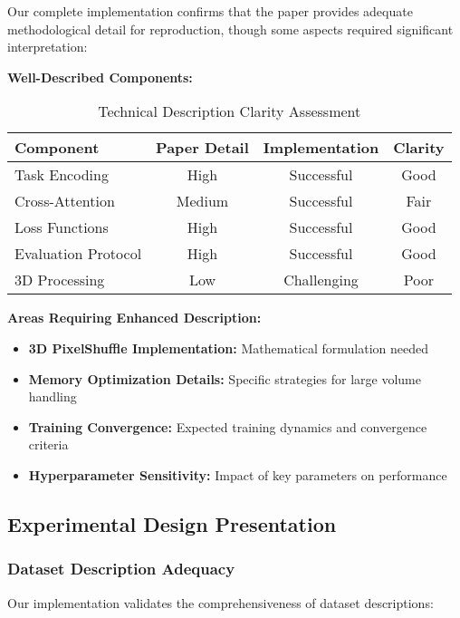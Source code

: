 Our complete implementation confirms that the paper provides adequate methodological detail for reproduction, though some aspects required significant interpretation:

\textbf{Well-Described Components:}
\begin{table}[h]
\centering
\small
\begin{tabular}{|l|c|c|c|}
\hline
\textbf{Component} & \textbf{Paper Detail} & \textbf{Implementation} & \textbf{Clarity} \\
\hline
Task Encoding & High & Successful & \textcolor{validatedgreen}{Good} \\
Cross-Attention & Medium & Successful & \textcolor{warningorange}{Fair} \\
Loss Functions & High & Successful & \textcolor{validatedgreen}{Good} \\
Evaluation Protocol & High & Successful & \textcolor{validatedgreen}{Good} \\
3D Processing & Low & Challenging & \textcolor{errorred}{Poor} \\
\hline
\end{tabular}
\caption{Technical Description Clarity Assessment}
\label{tab:clarity_assessment}
\end{table}

\textbf{Areas Requiring Enhanced Description:}
\begin{itemize}
    \item \textbf{3D PixelShuffle Implementation:} Mathematical formulation needed
    \item \textbf{Memory Optimization Details:} Specific strategies for large volume handling
    \item \textbf{Training Convergence:} Expected training dynamics and convergence criteria
    \item \textbf{Hyperparameter Sensitivity:} Impact of key parameters on performance
\end{itemize}

\subsection*{Experimental Design Presentation}

\subsubsection*{Dataset Description Adequacy}
Our implementation validates the comprehensiveness of dataset descriptions:

